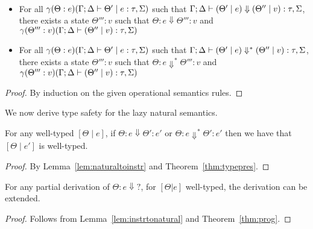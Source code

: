 \documentclass[acmsmall,review,anonymous,screen]{acmart}
\begin{document}
\begin{lemma}~\label{lem:instrtonatural}
  \begin{itemize}
\item  For all $\gamma(\Theta : e)(\Gamma ; \Delta \vdash \Theta' \mid
e : \tau,\Sigma)$ such that $\Gamma ; \Delta \vdash (\Theta' \mid e) \Downarrow
(\Theta'' \mid v) : \tau,\Sigma$, there exists a state $\Theta''' : v$
such that $\Theta : e \Downarrow \Theta''' : v$ and
$\gamma(\Theta''' : v)(\Gamma ; \Delta \vdash (\Theta'' \mid v) :
\tau,\Sigma)$
\item For all $\gamma(\Theta : e)(\Gamma ; \Delta \vdash \Theta' \mid
e : \tau,\Sigma)$ such that $\Gamma ; \Delta \vdash (\Theta' \mid e) \Downarrow^*
(\Theta'' \mid v) : \tau,\Sigma$, there exists a state $\Theta''' : v$
such that $\Theta : e \Downarrow^* \Theta''' : v$ and
$\gamma(\Theta''' : v)(\Gamma ; \Delta \vdash (\Theta'' \mid v) :
\tau,\Sigma)$
   \end{itemize}
 \end{lemma}
\begin{proof}
By induction on the given operational semantics rules.
  \end{proof}


  We now derive type safety for the lazy natural semantics.

  \begin{theorem}
For any well-typed $[\Theta \mid e]$, if $\Theta : e \Downarrow
\Theta' : e'$ or $\Theta : e \Downarrow^* \Theta' : e'$ then we have
that $[\Theta \mid e']$ is well-typed.
\end{theorem}
\begin{proof}
By Lemma~\ref{lem:naturaltoinstr} and Theorem~\ref{thm:typepres}.
\end{proof}

\begin{theorem}[Progress]
For any partial derivation of $\Theta : e \Downarrow?$, for $[\Theta |
e]$ well-typed, the derivation can be extended.
\end{theorem}
\begin{proof}
Follows from Lemma~\ref{lem:instrtonatural} and Theorem~\ref{thm:prog}.
 \end{proof}



\end{document}
